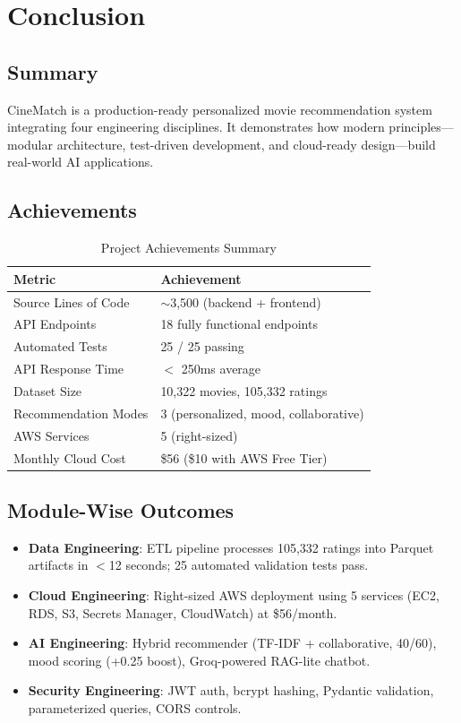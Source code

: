\documentclass[12pt,a4paper]{report}
\begin{document}
\chapter{Conclusion}

\section{Summary}

CineMatch is a production-ready personalized movie recommendation system integrating four engineering disciplines. It demonstrates how modern principles---modular architecture, test-driven development, and cloud-ready design---build real-world AI applications.

\section{Achievements}

\begin{table}[H]
\centering
\caption{Project Achievements Summary}
\begin{tabular}{|l|l|}
\hline
\textbf{Metric} & \textbf{Achievement} \\
\hline
Source Lines of Code & $\sim$3,500 (backend + frontend) \\
API Endpoints & 18 fully functional endpoints \\
Automated Tests & 25 / 25 passing \\
API Response Time & $<$ 250ms average \\
Dataset Size & 10,322 movies, 105,332 ratings \\
Recommendation Modes & 3 (personalized, mood, collaborative) \\
AWS Services & 5 (right-sized) \\
Monthly Cloud Cost & \$56 (\$10 with AWS Free Tier) \\
\hline
\end{tabular}
\end{table}

\section{Module-Wise Outcomes}

\begin{itemize}
    \item \textbf{Data Engineering}: ETL pipeline processes 105,332 ratings into Parquet artifacts in $<$12 seconds; 25 automated validation tests pass.
    \item \textbf{Cloud Engineering}: Right-sized AWS deployment using 5 services (EC2, RDS, S3, Secrets Manager, CloudWatch) at \$56/month.
    \item \textbf{AI Engineering}: Hybrid recommender (TF-IDF + collaborative, 40/60), mood scoring (+0.25 boost), Groq-powered RAG-lite chatbot.
    \item \textbf{Security Engineering}: JWT auth, bcrypt hashing, Pydantic validation, parameterized queries, CORS controls.
\end{itemize}
\end{document}
